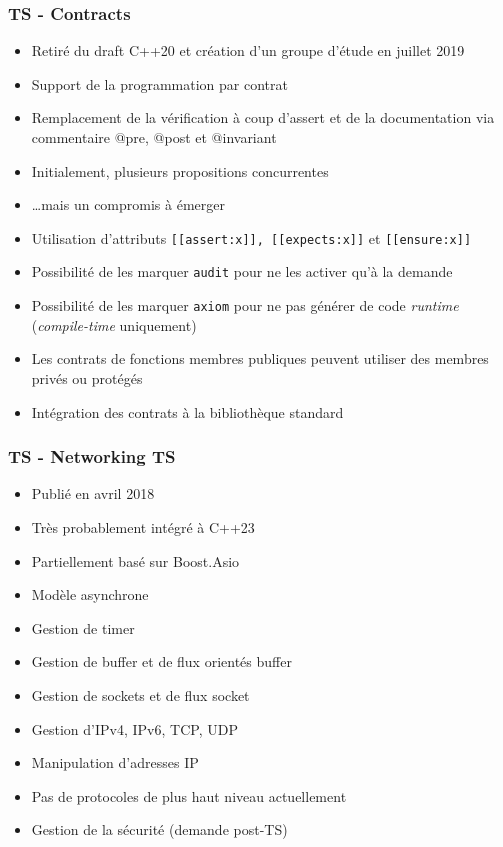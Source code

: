 \documentclass[C++.tex]{subfiles}
\begin{document}
\begin{frame}
	\frametitle{TS - Contracts}
	\begin{itemize}
		\item Retiré du draft C++20 et création d'un groupe d'étude en juillet 2019


		\item Support de la programmation par contrat
		\item Remplacement de la vérification à coup d'assert et de la documentation via commentaire @pre, @post et @invariant
		\item Initialement, plusieurs propositions \og concurrentes\fg{}
		\item \ldots{}mais un compromis à émerger
		\item Utilisation d'attributs \lstinline|[[assert:x]], |\lstinline|[[expects:x]]| et \lstinline|[[ensure:x]]|


		\item Possibilité de les marquer \lstinline|audit| pour ne les activer qu'à la demande
		\item Possibilité de les marquer \lstinline|axiom| pour ne pas générer de code \textit{runtime} (\textit{compile-time} uniquement)
		\item Les contrats de fonctions membres publiques peuvent utiliser des membres privés ou protégés
		\item Intégration des contrats à la bibliothèque standard
	\end{itemize}
\end{frame}

\begin{frame}
	\frametitle{TS - Networking TS}
	\begin{itemize}
		\item Publié en avril 2018
		\item Très probablement intégré à C++23
		\item Partiellement basé sur Boost.Asio
		\item Modèle asynchrone
		\item Gestion de timer
		\item Gestion de buffer et de flux orientés buffer
		\item Gestion de sockets et de flux \og socket\fg{}
		\item Gestion d'IPv4, IPv6, TCP, UDP
		\item Manipulation d'adresses IP
		\item Pas de protocoles de plus haut niveau actuellement
		\item Gestion de la sécurité (demande post-TS)
	\end{itemize}
\end{frame}
\end{document}
